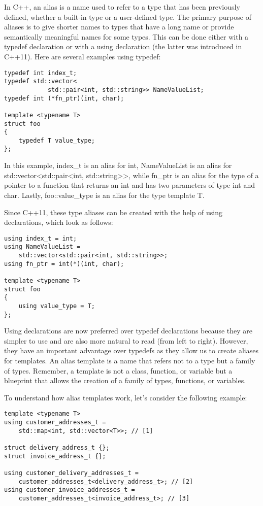 In C++, an alias is a name used to refer to a type that has been previously defined, whether a built-in type or a user-defined type. The primary purpose of aliases is to give shorter names to types that have a long name or provide semantically meaningful names for some types. This can be done either with a typedef declaration or with a using declaration (the latter was introduced in C++11). Here are several examples using typedef:

\begin{lstlisting}[style=styleCXX]
typedef int index_t;
typedef std::vector<
			std::pair<int, std::string>> NameValueList;
typedef int (*fn_ptr)(int, char);

template <typename T>
struct foo
{
	typedef T value_type;
};
\end{lstlisting}

In this example, index\_t is an alias for int, NameValueList is an alias for std::vector<std::pair<int, std::string>>, while fn\_ptr is an alias for the type of a pointer to a function that returns an int and has two parameters of type int and char. Lastly, foo::value\_type is an alias for the type template T.

Since C++11, these type aliases can be created with the help of using declarations, which look as follows:

\begin{lstlisting}[style=styleCXX]
using index_t = int;
using NameValueList =
	std::vector<std::pair<int, std::string>>;
using fn_ptr = int(*)(int, char);

template <typename T>
struct foo
{
	using value_type = T;
};
\end{lstlisting}

Using declarations are now preferred over typedef declarations because they are simpler to use and are also more natural to read (from left to right). However, they have an important advantage over typedefs as they allow us to create aliases for templates. An alias template is a name that refers not to a type but a family of types. Remember, a template is not a class, function, or variable but a blueprint that allows the creation of a family of types, functions, or variables.

To understand how alias templates work, let's consider the following example:

\begin{lstlisting}[style=styleCXX]
template <typename T>
using customer_addresses_t =
	std::map<int, std::vector<T>>; // [1]
	
struct delivery_address_t {};
struct invoice_address_t {};

using customer_delivery_addresses_t =
	customer_addresses_t<delivery_address_t>; // [2]
using customer_invoice_addresses_t =
	customer_addresses_t<invoice_address_t>; // [3]
\end{lstlisting}

